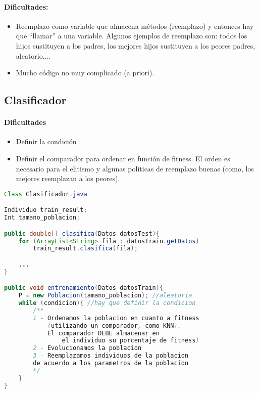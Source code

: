 \documentclass[nochap]{apuntes}
\begin{document}
\paragraph{Dificultades:}
\begin{itemize}
	\item Reemplazo como variable que almacena métodos (reemplazo) y entonces hay que ``llamar'' a una variable. Algunos ejemplos de reemplazo son: todos los hijos sustituyen a los padres, los mejores hijos sustituyen a los peores padres, aleatorio,...

	\item Mucho código no muy complicado (a priori).
\end{itemize}




\subsection{Clasificador}

\paragraph{Dificultades}

\begin{itemize}
	\item Definir la condición
	\item Definir el comparador para ordenar en función de fitness.
	\subitem El orden es necesario para el elitismo y algunas políticas de reemplazo buenas (como, los mejores reemplazan a los peores).
\end{itemize}

\begin{lstlisting}[language=Java]
Class Clasificador.java

Individuo train_result;
Int tamano_poblacion;

public double[] clasifica(Datos datosTest){
	for (ArrayList<String> fila : datosTrain.getDatos)
		train_result.clasifica(fila);

	...
}

public void entrenamiento(Datos datosTrain){
	P = new Poblacion(tamano_poblacion); //aleatoria
	while (condicion){ //hay que definir la condicion
		/**
		1 - Ordenamos la poblacion en cuanto a fitness
			(utilizando un comparador, como KNN).
			El comparador DEBE almacenar en
				el individuo su porcentaje de fitness)
		2 - Evolucionamos la poblacion
		3 - Reemplazamos individuos de la poblacion
		de acuerdo a los parametros de la poblacion
		*/
	}
}

\end{lstlisting}
\end{document}
